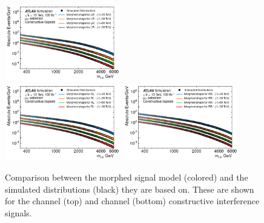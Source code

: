 {\begin{figure}[htp]
\includegraphics[width=0.45\textwidth]{figures/ci/morphedPdf/sigComp-const-LR-mm.png} \\
\includegraphics[width=0.45\textwidth]{figures/ci/morphedPdf/sigComp-const-RL-mm.png}
\includegraphics[width=0.45\textwidth]{figures/ci/morphedPdf/sigComp-const-RR-mm.png}
\caption{Comparison between the morphed signal model (colored) and the simulated distributions (black) they are based on.
These are shown for the \ee channel (top) and \mm channel (bottom) constructive interference signals.
}
\label{fig:ciSigModelTemplateCompConst}
\end{figure}
\clearpage
}

